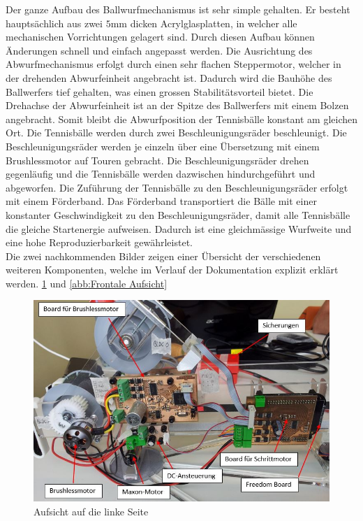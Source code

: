     Der ganze Aufbau des Ballwurfmechanismus ist sehr simple gehalten. Er besteht 
    hauptsächlich aus zwei $5\si{\milli\meter}$ dicken Acrylglasplatten, in welcher alle mechanischen 
    Vorrichtungen gelagert sind. Durch diesen Aufbau können Änderungen schnell und 
    einfach angepasst werden. Die Ausrichtung des Abwurfmechanismus erfolgt durch 
    einen sehr flachen Steppermotor, welcher in der drehenden Abwurfeinheit angebracht 
    ist. Dadurch wird die Bauhöhe des Ballwerfers tief gehalten, was einen grossen 
    Stabilitätsvorteil bietet. Die Drehachse der Abwurfeinheit ist an der Spitze des 
    Ballwerfers mit einem Bolzen angebracht. Somit bleibt die Abwurfposition der 
    Tennisbälle konstant am gleichen Ort. Die Tennisbälle werden durch zwei 
    Beschleunigungsräder beschleunigt. Die Beschleunigungsräder werden je einzeln 
    über eine Übersetzung mit einem Brushlessmotor auf Touren gebracht. Die Beschleunigungsräder 
    drehen gegenläufig und die Tennisbälle werden dazwischen hindurchgeführt und 
    abgeworfen. Die Zuführung der Tennisbälle zu den Beschleunigungsräder erfolgt mit 
    einem Förderband. Das Förderband transportiert die Bälle mit einer 
    konstanter Geschwindigkeit zu den Beschleunigungsräder, damit alle Tennisbälle die 
    gleiche Startenergie aufweisen. Dadurch ist eine gleichmässige Wurfweite und eine 
    hohe Reproduzierbarkeit gewährleistet. \\
    Die zwei nachkommenden Bilder zeigen einer Übersicht der verschiedenen weiteren Komponenten, welche im Verlauf der Dokumentation explizit erklärt werden. 
    \ref{abb:Aufsicht auf die linke Seite} und \ref{abb:Frontale Aufsicht} 
	
	\begin{figure}[h!]
	   	\includegraphics[width=.93\textwidth,clip,trim=0mm 0mm 0mm 0mm]
	   	{Enddokumentation/Bilder/Geraeteuebersicht_1.jpg}
	   	\centering
	   	\caption{Aufsicht auf die linke Seite}
	   	\label{abb:Aufsicht auf die linke Seite}
	\end{figure}
	
